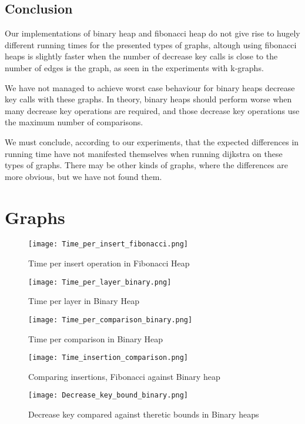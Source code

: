 \documentclass[a4paper,10pt]{article}
\begin{document}
\subsection*{Conclusion}

Our implementations of binary heap and fibonacci heap do not give rise to hugely different running times for the presented types of graphs, altough using fibonacci heaps is slightly faster when the number of decrease key calls is close to the number of edges is the graph, as seen in the experiments with k-graphs.

We have not managed to achieve worst case behaviour for binary heaps decrease key calls with these graphs. In theory, binary heaps should perform worse when many decrease key operations are required, and those decrease key operations use the maximum number of comparisons.

We must conclude, according to our experiments, that the expected differences in running time have not manifested themselves when running dijkstra on these types of graphs. There may be other kinds of graphs, where the differences are more obvious, but we have not found them.
\clearpage
\appendix 
\section{Graphs}
\begin{figure}[h]
    \label{timeinsertfib}
  \texttt{[image: Time\_per\_insert\_fibonacci.png]}
  \caption{Time per insert operation in Fibonacci Heap}
\end{figure}

\begin{figure}[h]
    \label{timeprlayerbin}
  \texttt{[image: Time\_per\_layer\_binary.png]}
  \caption{Time per layer in Binary Heap}
\end{figure}

\begin{figure}[h]
    \label{timepercompbin}
  \texttt{[image: Time\_per\_comparison\_binary.png]}
  \caption{Time per comparison in Binary Heap}
\end{figure}

\begin{figure}[h]
    \label{timeinscomp}
  \texttt{[image: Time\_insertion\_comparison.png]}
  \caption{Comparing insertions, Fibonacci against Binary heap}
\end{figure}

\begin{figure}[h]
    \label{deckeyboundbin}
  \texttt{[image: Decrease\_key\_bound\_binary.png]}
  \caption{Decrease key compared against theretic bounds in Binary heaps}
\end{figure}
\end{document}

